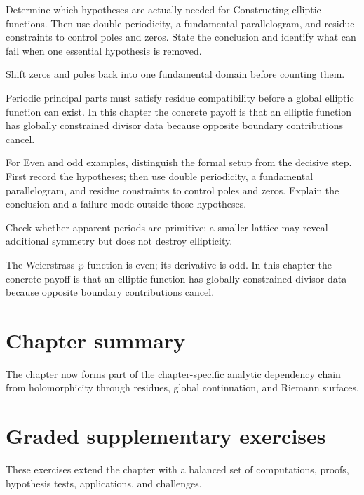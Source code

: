 \begin{exercise}\label{exr:iv28-07}
Determine which hypotheses are actually needed for Constructing elliptic functions. Then use double periodicity, a fundamental parallelogram, and residue constraints to control poles and zeros. State the conclusion and identify what can fail when one essential hypothesis is removed.
\end{exercise}
\begin{hint}
Shift zeros and poles back into one fundamental domain before counting them.
\end{hint}
\begin{solution}
Periodic principal parts must satisfy residue compatibility before a global elliptic function can exist. In this chapter the concrete payoff is that an elliptic function has globally constrained divisor data because opposite boundary contributions cancel.
\end{solution}

\begin{exercise}\label{exr:iv28-08}
For Even and odd examples, distinguish the formal setup from the decisive step. First record the hypotheses; then use double periodicity, a fundamental parallelogram, and residue constraints to control poles and zeros. Explain the conclusion and a failure mode outside those hypotheses.
\end{exercise}
\begin{hint}
Check whether apparent periods are primitive; a smaller lattice may reveal additional symmetry but does not destroy ellipticity.
\end{hint}
\begin{solution}
The Weierstrass $\wp$-function is even; its derivative is odd. In this chapter the concrete payoff is that an elliptic function has globally constrained divisor data because opposite boundary contributions cancel.
\end{solution}

\section*{Chapter summary}
The chapter now forms part of the chapter-specific analytic dependency chain from holomorphicity through residues, global continuation, and Riemann surfaces.
\section{Graded supplementary exercises}
These exercises extend the chapter with a balanced set of computations, proofs, hypothesis tests, applications, and challenges.

